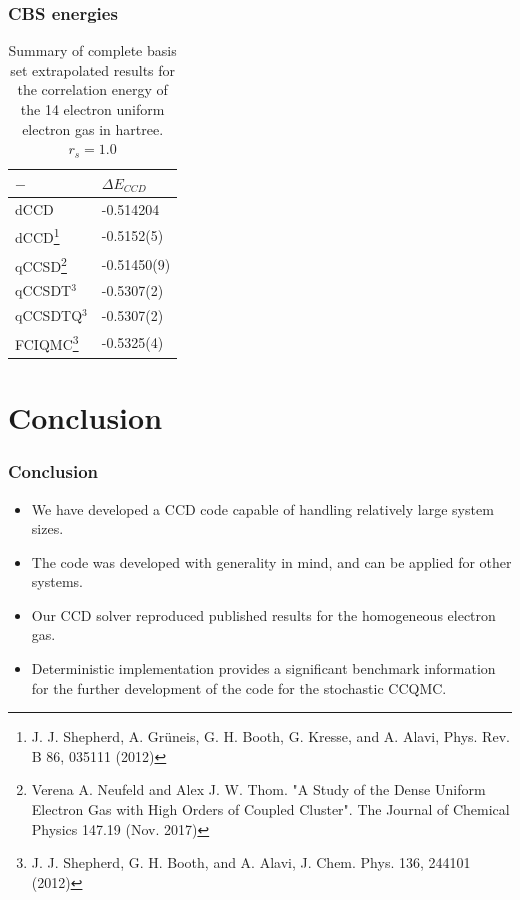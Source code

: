 \documentclass{beamer}
\begin{document}
\begin{frame}
\frametitle{CBS energies}
\begin{table}[h]
\centering
\caption{\tiny Summary of complete basis set extrapolated results for the correlation energy of the 14 electron uniform electron gas in hartree. $r_s = 1.0$} \label{tab:CCDQMC}
\tiny  %
\begin{tabular}{ll}
$-$ &  $\Delta E_{CCD}$ \\
\hline
\hline
dCCD & -0.514204 \\
dCCD\footnote{\tiny J. J. Shepherd, A. Grüneis, G. H. Booth, G. Kresse, and A. Alavi, Phys. Rev. B 86, 035111 (2012)} & -0.5152(5) \\
\hline
qCCSD\footnote{\tiny Verena A. Neufeld and Alex J. W. Thom. "A Study of the Dense Uniform Electron Gas with High Orders of Coupled Cluster". The Journal of Chemical Physics 147.19 (Nov. 2017)} & -0.51450(9) \\
qCCSDT$^3$ & -0.5307(2) \\
qCCSDTQ$^3$ & -0.5307(2) \\			
\hline
FCIQMC\footnote{\tiny J. J. Shepherd, G. H. Booth, and A. Alavi, J. Chem. Phys. 136, 244101 (2012)} & -0.5325(4) \\
\hline     
\end{tabular}
\end{table}

\end{frame}


\section{Conclusion}

\begin{frame}
\frametitle{Conclusion}
\begin{itemize}
\item We have developed a CCD code capable of handling relatively large system sizes. 
\item The code was developed with generality in mind, and can be applied for other systems.
\item Our CCD solver reproduced published results for the homogeneous electron gas.
\item Deterministic implementation provides a significant benchmark information for the further development of the code for the stochastic CCQMC.
\end{itemize}
\end{frame}
\end{document}
